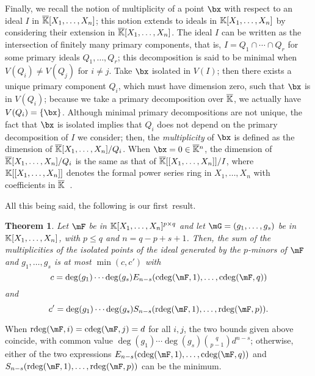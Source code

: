 \documentclass[12pt]{article}
\newtheorem{theorem}[definition]{Theorem}
\begin{document}
Finally, we recall the notion of multiplicity of a point $\bx$ with
respect to an ideal $I$ in
$\overline{\mathbb{K}}[X_1,\dots,X_n]$; this notion
extends to ideals in $\mathbb{K}[X_1, \ldots, X_n]$ by considering their
extension in $\overline{\mathbb{K}}[X_1, \ldots, X_n]$. The ideal $I$ can be written
as the intersection of finitely many primary components, that is,
$I=Q_1\cap\cdots \cap Q_r$ for some primary ideals $Q_1,\dots,Q_r$;
this decomposition is said to be minimal when $V(Q_i)\neq V(Q_j)$ for
$i\neq j$. Take $\bx$ isolated in $V(I)$; then there exists a unique
primary component $Q_i$, which must have dimension zero, such that
$\bx$ is in $V(Q_i)$; because we take a primary decomposition over
$\overline{\mathbb{K}}$, we actually have $V(Q_i)=\{\bx\}$. Although minimal primary
decompositions are not unique, the fact that $\bx$ is isolated implies
that $Q_i$ does not depend on the primary decomposition of $I$ we
consider; then, the \emph{multiplicity} of $\bx$ is defined as the
dimension of $\overline{\mathbb{K}}[X_1,\dots,X_n]/Q_i$. When $\bx=0\in\KKbar{}^n$,
the dimension of $\overline{\mathbb{K}}[X_1,\dots,X_n]/Q_i$ is the same as that of
$\overline{\mathbb{K}}[[X_1, \ldots, X_n]]/I$, where $\mathbb{K}[[X_1, \ldots, X_n]]$
denotes the formal power series ring in $X_1, \ldots, X_n$ with
coefficients in $\overline{\mathbb{K}}$~\cite[Theorem 4.2.2]{CLO_UAG}.

All this being said, the following is our first~result.

\begin{theorem}\label{theo:1}
  Let $\mF$ be in $\mathbb{K}[X_1,\dots,X_n]^{p \times q}$ and let
  $\mG=(g_1,\dots,g_s)$ be in $\mathbb{K}[X_1,\dots,X_n]$, with $p \le q$ and
  $n=q-p+s+1$. Then, the sum of the multiplicities of the isolated
  points of the ideal generated by the $p$-minors of $\mF$ and 
$ g_1,\dots,g_s$ is at most
  $\min(c,c')$ with
$$c=\deg(g_1) \cdots \deg(g_s) E_{n-s}(\cdeg(\mF,1), \ldots, \cdeg(\mF,q))$$
and
$$c'=\deg(g_1) \cdots \deg(g_s) S_{n-s}(\rdeg(\mF,1), \ldots, \rdeg(\mF,p)).$$
\end{theorem}
When $\rdeg(\mF,i)=\cdeg(\mF,j)=d$ for all $i,j$, the two bounds given
above coincide, with common value $\deg(g_1) \cdots \deg(g_s) {q \choose {p-1}} d^{n-s}$; otherwise, either of the two expressions
$E_{n-s}(\cdeg(\mF,1), \ldots, \cdeg(\mF,q))$ and
$S_{n-s}(\rdeg(\mF,1), \ldots, \rdeg(\mF,p))$ can be the minimum. 
\end{document}
